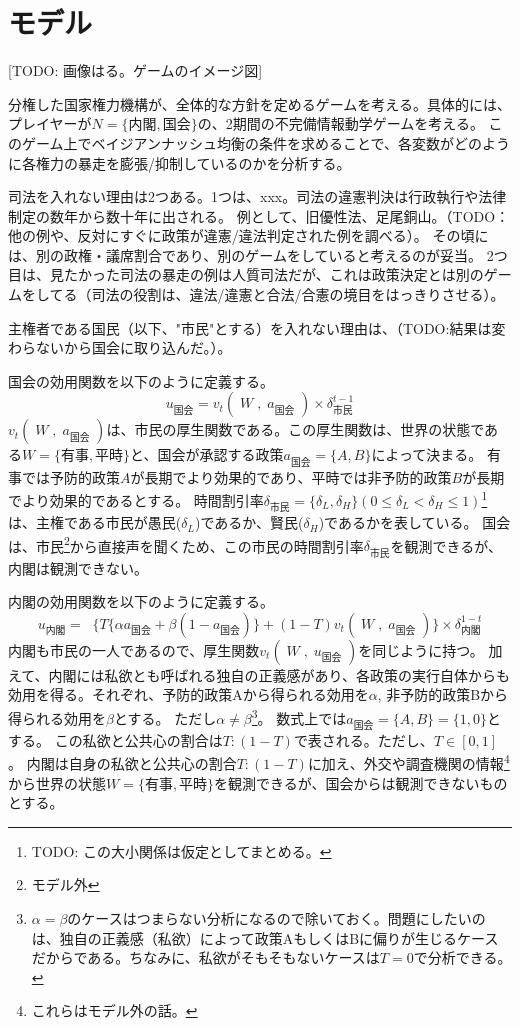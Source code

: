 \documentclass[main.tex]{subfiles}
\begin{document}
\section{モデル}

[TODO: 画像はる。ゲームのイメージ図]

分権した国家権力機構が、全体的な方針を定めるゲームを考える。具体的には、
プレイヤーが$N=\lbrace 内閣, 国会 \rbrace$の、2期間の不完備情報動学ゲームを考える。
このゲーム上でベイジアンナッシュ均衡の条件を求めることで、各変数がどのように各権力の暴走を膨張/抑制しているのかを分析する。



司法を入れない理由は2つある。1つは、xxx。司法の違憲判決は行政執行や法律制定の数年から数十年に出される。
例として、旧優性法、足尾銅山。（TODO：他の例や、反対にすぐに政策が違憲/違法判定された例を調べる）。
その頃には、別の政権・議席割合であり、別のゲームをしていると考えるのが妥当。
2つ目は、見たかった司法の暴走の例は人質司法だが、これは政策決定とは別のゲームをしてる（司法の役割は、違法/違憲と合法/合憲の境目をはっきりさせる）。

主権者である国民（以下、"市民"とする）を入れない理由は、（TODO:結果は変わらないから国会に取り込んだ。）。


国会の効用関数を以下のように定義する。
$$u_\text{国会} = v_t(\;W\;,\; a_\text{国会}\;) × \delta^{t-1}_\text{市民}$$
$v_t(\;W\;,\; a_\text{国会}\;)$は、市民の厚生関数である。この厚生関数は、世界の状態である$W=\lbrace 有事, 平時\rbrace$と、国会が承認する政策$a_{国会}=\lbrace A, B\rbrace$によって決まる。
有事では予防的政策$A$が長期でより効果的であり、平時では非予防的政策$B$が長期でより効果的であるとする。
時間割引率$\delta_{市民}=\lbrace \delta_L, \delta_H \rbrace (0\le \delta_L<\delta_H \le 1)$\footnote{TODO: この大小関係は仮定としてまとめる。}は、主権である市民が愚民($\delta_L$)であるか、賢民($\delta_H$)であるかを表している。
国会は、市民\footnote{モデル外}から直接声を聞くため、この市民の時間割引率$\delta_{市民}$を観測できるが、内閣は観測できない。

内閣の効用関数を以下のように定義する。
$$ u_\text{内閣} =\;\; \lbrace T\lbrace \alpha a_\text{国会} + \beta (1-a_\text{国会}) \rbrace  + (1-T)v_t(\;W\;,\; a_\text{国会}\;) \rbrace × \delta^{1-t}_{内閣}$$
内閣も市民の一人であるので、厚生関数$v_t(\;W\;,\; u_\text{国会}\;)$を同じように持つ。
加えて、内閣には私欲とも呼ばれる独自の正義感があり、各政策の実行自体からも効用を得る。それぞれ、予防的政策Aから得られる効用を$\alpha$, 非予防的政策Bから得られる効用を$\beta$とする。
ただし$\alpha ≠ \beta$\footnote{$\alpha=\beta$のケースはつまらない分析になるので除いておく。問題にしたいのは、独自の正義感（私欲）によって政策AもしくはBに偏りが生じるケースだからである。ちなみに、私欲がそもそもないケースは$T=0$で分析できる。}。
数式上では$a_{国会}=\lbrace A, B\rbrace = \lbrace 1,0\rbrace$とする。
この私欲と公共心の割合は$T:(1-T)$で表される。ただし、$T\in[0,1]$ 。
内閣は自身の私欲と公共心の割合$T:(1-T)$に加え、外交や調査機関の情報\footnote{これらはモデル外の話。}から世界の状態$W=\lbrace 有事, 平時\rbrace$を観測できるが、国会からは観測できないものとする。
\end{document}
